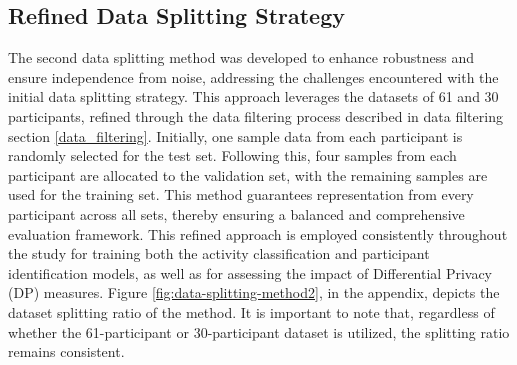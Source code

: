 \documentclass{l4proj}
\begin{document}
\subsection{Refined Data Splitting Strategy}
The second data splitting method was developed to enhance robustness and ensure independence from noise, addressing the challenges encountered with the initial data splitting strategy. This approach leverages the datasets of 61 and 30 participants, refined through the data filtering process described in data filtering section \ref{data_filtering}. Initially, one sample data from each participant is randomly selected for the test set. Following this, four samples from each participant are allocated to the validation set, with the remaining samples are used for the training set. This method guarantees representation from every participant across all sets, thereby ensuring a balanced and comprehensive evaluation framework. This refined approach is employed consistently throughout the study for training both the activity classification and participant identification models, as well as for assessing the impact of Differential Privacy (DP) measures. Figure \ref{fig:data-splitting-method2}, in the appendix, depicts the dataset splitting ratio of the method. It is important to note that, regardless of whether the 61-participant or 30-participant dataset is utilized, the splitting ratio remains consistent.
\end{document}
